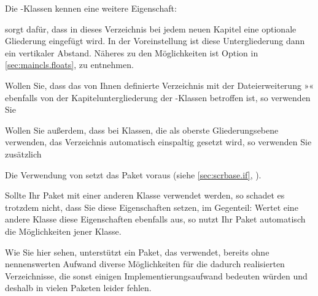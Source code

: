 Die \KOMAScript-Klassen kennen eine weitere Eigenschaft:
\begin{description}
\item[\PValue{chapteratlist}] sorgt dafür, dass in dieses Verzeichnis bei
  jedem neuen Kapitel eine optionale Gliederung eingefügt wird. In der
  Voreinstellung ist diese Untergliederung dann ein vertikaler
  Abstand. Näheres zu den Möglichkeiten ist Option
   in
  \autoref{sec:maincls.floats},  zu
  entnehmen.
\end{description}
\begin{Example}
  %
  Wollen Sie, dass das von Ihnen definierte Verzeichnis
  mit der Dateierweiterung »« ebenfalls von der
  Kapiteluntergliederung der \KOMAScript-Klassen betroffen ist, so verwenden
  Sie
\begin{lstcode}
\end{lstcode}
Wollen Sie außerdem, dass bei Klassen, die  als
oberste Gliederungsebene verwenden, das Verzeichnis automatisch einspaltig
gesetzt wird, so verwenden Sie zusätzlich
\begin{lstcode}
\end{lstcode}
  Die Verwendung von 
  setzt das Paket  voraus (siehe
  \autoref{sec:scrbase.if},
  ).

  Sollte Ihr Paket mit einer anderen Klasse verwendet werden,
  so schadet es trotzdem nicht, dass Sie diese Eigenschaften setzen, im
  Gegenteil: Wertet eine andere Klasse diese Eigenschaften ebenfalls aus, so
  nutzt Ihr Paket automatisch die Möglichkeiten jener Klasse.
\end{Example}
Wie Sie hier sehen, unterstützt ein Paket, das  verwendet,
bereits ohne nennenswerten Aufwand diverse Möglichkeiten für die dadurch
realisierten Verzeichnisse, die sonst einigen Implementierungsaufwand
bedeuten würden und deshalb in vielen Paketen leider fehlen.%
\EndIndexGroup



